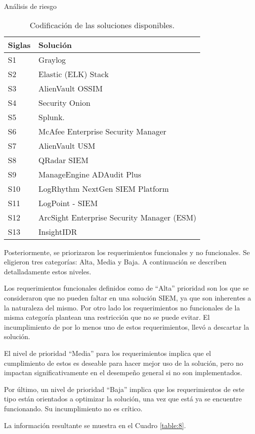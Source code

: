 \begin{section}{Análisis de riesgo}
\begin{table}[H]
\begin{tabular}{|m{6em}|m{20em}|}
            \hline 
                Siglas  & Solución \\ 
            \hline
                S1 & Graylog \\ 
            \hline
                S2  & Elastic (ELK) Stack \\ 
            \hline
                S3 & AlienVault OSSIM \\
            \hline
                S4 & Security Onion \\
            \hline
                S5 & Splunk. \\
            \hline
                S6 & McAfee Enterprise Security Manager \\
            \hline
                S7 & AlienVault USM \\
            \hline
                S8 & QRadar SIEM \\
            \hline
                S9 & ManageEngine ADAudit Plus \\
            \hline
                S10 & LogRhythm NextGen SIEM Platform \\
            \hline
                S11 & LogPoint - SIEM \\
            \hline
                S12 & ArcSight Enterprise Security Manager (ESM) \\
            \hline
                S13 & InsightIDR \\
            \hline %
        \end{tabular}
        \caption{Codificación de las soluciones disponibles.}
        \label{table:7}
    \end{table}
     \FloatBarrier
     
     Posteriormente, se priorizaron los requerimientos funcionales y no funcionales. Se eligieron tres categorías: Alta, Media y Baja. A continuación se describen detalladamente estos niveles.\par
     Los requerimientos funcionales definidos como de “Alta” prioridad son los que se consideraron que no pueden faltar en una solución SIEM, ya que son inherentes a la naturaleza del mismo. Por otro lado los requerimientos no funcionales de la misma categoría plantean una restricción que no se puede evitar. El incumplimiento de por lo menos uno de estos requerimientos, llevó a descartar la solución. \par
     El nivel de prioridad “Media” para los requerimientos implica  que el cumplimiento de estos es deseable para hacer mejor uso de la solución, pero no impactan significativamente en el desempeño general si no son implementados.\par
     Por último, un nivel de prioridad “Baja” implica que los requerimientos de este tipo están orientados a optimizar la solución, una vez que está ya se encuentre funcionando. Su incumplimiento no es crítico. \par 
     La información resultante se muestra en el Cuadro \ref{table:8}.
     \begin{table}[H]
        \centering
        \begin{tabular}{|m{3em}|m{28em}|m{4em}|}
        

\end{tabular}
\end{table}
\end{section}
